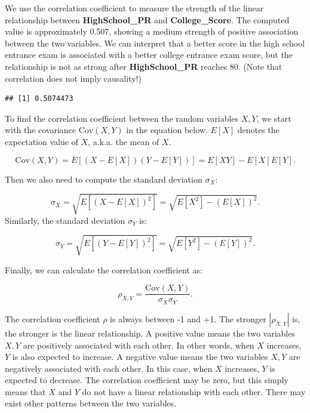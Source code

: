 \documentclass[
]{article}
\newenvironment{Shaded}{\begin{snugshade}}{\end{snugshade}}
\newcommand{\FunctionTok}[1]{\textcolor[rgb]{0.00,0.00,0.00}{#1}}
\newcommand{\NormalTok}[1]{#1}
\newcommand{\SpecialCharTok}[1]{\textcolor[rgb]{0.00,0.00,0.00}{#1}}
\begin{document}
We use the correlation coefficient to measure the strength of the linear
relationship between \textbf{HighSchool\_PR} and
\textbf{College\_Score}. The computed value is approximately 0.507,
showing a medium strength of positive association between the two
variables. We can interpret that a better score in the high school
entrance exam is associated with a better college entrance exam score,
but the relationship is not as strong after \textbf{HighSchool\_PR}
reaches 80. (Note that correlation does not imply causality!)

\begin{Shaded}
\end{Shaded}

\begin{verbatim}
## [1] 0.5074473
\end{verbatim}

To find the correlation coefficient between the random variables
\(X, Y\), we start with the covariance \(\text{Cov}(X,Y)\) in the
equation below. \(E[X]\) denotes the expectation value of \(X\), a.k.a.
the mean of \(X\).

\[\text{Cov}(X,Y) = E[(X-E[X])(Y-E[Y])] = E[XY] - E[X]E[Y].\]

Then we also need to compute the standard deviation \(\sigma_X\):

\[\sigma_X = \sqrt{E[(X-E[X])^2]} = \sqrt{E[X^2]-(E[X])^2}.\] Similarly,
the standard deviation \(\sigma_Y\) is:

\[\sigma_Y = \sqrt{E[(Y-E[Y])^2]} = \sqrt{E[Y^2]-(E[Y])^2}.\]

Finally, we can calculate the correlation coefficient as:

\[\rho_{X,Y} = \dfrac{\text{Cov}(X,Y)}{\sigma_X \sigma_Y}.\]

The correlation coefficient \(\rho\) is always between -1 and +1. The
stronger \(|\rho_{X,Y}|\) is, the stronger is the linear relationship. A
positive value means the two variables \(X,Y\) are positively associated
with each other. In other words, when \(X\) increases, \(Y\) is also
expected to increase. A negative value means the two variables \(X,Y\)
are negatively associated with each other. In this case, when \(X\)
increases, \(Y\) is expected to decrease. The correlation coefficient
may be zero, but this simply means that \(X\) and \(Y\) do not have a
linear relationship with each other. There may exist other patterns
between the two variables.
\end{document}
